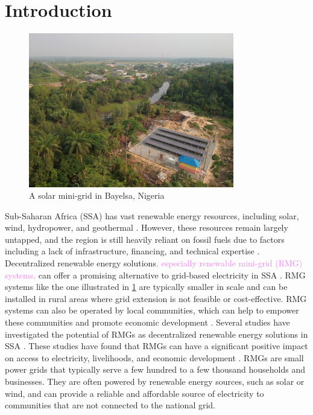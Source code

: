 \section{Introduction}
\label{sec:intro}
\begin{figure}[th]
    \centering
    \includegraphics[width=0.8\textwidth]{images/mini-grid-bayelsa.jpg}
    \caption{A solar mini-grid in Bayelsa, Nigeria}
    \label{fig:mini-grid}
\end{figure}

Sub-Saharan Africa (SSA) has vast renewable energy resources, including solar, wind, hydropower, and geothermal \cite{hafner2018prospects}. However, these resources remain largely untapped, and the region is still heavily reliant on fossil fuels due to factors including a lack of infrastructure, financing, and technical expertise \cite{irena2022renewable}. Decentralized renewable energy solutions\textcolor{violet}{, especially renewable mini-grid (RMG) systems,} can offer a promising alternative to grid-based electricity in SSA \cite{moro2018ensuring, rasagam2018delivering}. RMG systems like the one illustrated in \cref{fig:mini-grid} are typically smaller in scale and can be installed in rural areas where grid extension is not feasible or cost-effective. RMG systems can also be operated by local communities, which can help to empower these communities and promote economic development \cite{deshmukh2009role, edwards2018role}.
Several studies have investigated the potential of RMGs as decentralized renewable energy solutions in SSA \cite{rabetanetiarimanana2018pv, okunlola2018assessment, moner2018electrification}. These studies have found that RMGs can have a significant positive impact on access to electricity, livelihoods, and economic development \cite{dawoud2018hybrid}. RMGs are small power grids that typically serve a few hundred to a few thousand households and businesses. They are often powered by renewable energy sources, such as solar or wind, and can provide a reliable and affordable source of electricity to communities that are not connected to the national grid.

